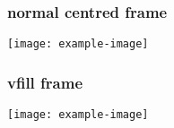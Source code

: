 \documentclass{beamer}
\begin{document}
    \begin{frame}[c]
        \frametitle{normal centred frame}
        \centering
        \texttt{[image: example-image]}
    \end{frame}

    \begin{frame}
        \frametitle{vfill frame}
        \vfill
        \centering
        \texttt{[image: example-image]}
        \vfill
    \end{frame}
\end{document}
